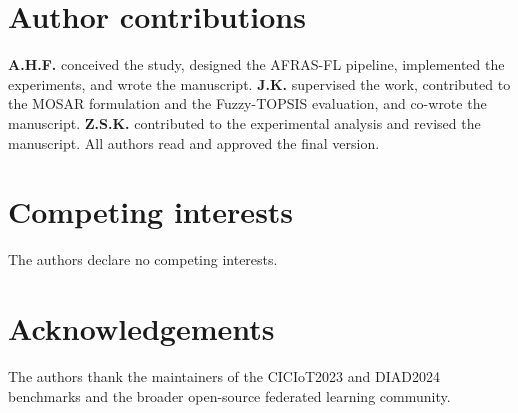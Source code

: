 \documentclass[journal]{IEEEtran}
\begin{document}
\section*{Author contributions}
\textbf{A.H.F.} conceived the study, designed the AFRAS-FL
pipeline, implemented the experiments, and wrote the manuscript.
\textbf{J.K.} supervised the work, contributed to the MOSAR
formulation and the Fuzzy-TOPSIS evaluation, and co-wrote the
manuscript. \textbf{Z.S.K.} contributed to the experimental analysis
and revised the manuscript. All authors read and approved the final
version.

\section*{Competing interests}
The authors declare no competing interests.

\section*{Acknowledgements}
The authors thank the maintainers of the CICIoT2023 and DIAD2024
benchmarks and the broader open-source federated learning community.




\FloatBarrier



\end{document}
